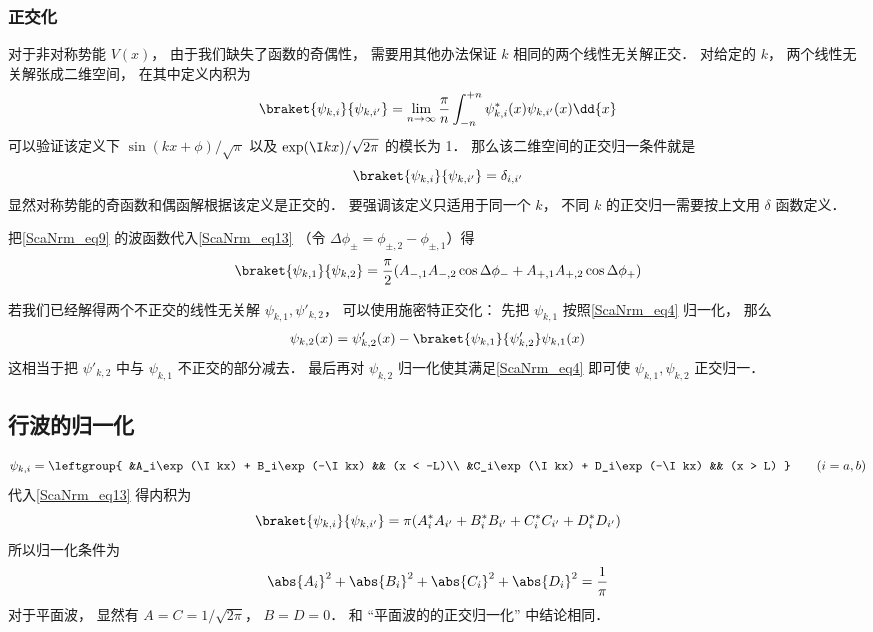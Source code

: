 \subsubsection{正交化}
对于非对称势能 $V(x)$， 由于我们缺失了函数的奇偶性， 需要用其他办法保证 $k$ 相同的两个线性无关解正交． 对给定的 $k$， 两个线性无关解张成二维空间， 在其中定义内积为
\begin{equation}\label{ScaNrm_eq13}
\braket{\psi_{k,i}}{\psi_{k,i'}} = \lim_{n\to\infty}\frac{\pi}{n}\int_{-n}^{+n} \psi_{k,i}^*(x) \psi_{k,i'}(x) \dd{x}
\end{equation}
可以验证该定义下 $\sin(kx+\phi)/\sqrt{\pi}$ 以及 $\exp(\I kx)/\sqrt{2\pi}$ 的模长为 1． 那么该二维空间的正交归一条件就是
\begin{equation}\label{ScaNrm_eq7}
\braket{\psi_{k,i}}{\psi_{k,i'}} = \delta_{i,i'}
\end{equation}
显然对称势能的奇函数和偶函解根据该定义是正交的． 要强调该定义只适用于同一个 $k$， 不同 $k$ 的正交归一需要按上文用 $\delta$ 函数定义．

把\autoref{ScaNrm_eq9} 的波函数代入\autoref{ScaNrm_eq13} （令 $\Delta\phi_\pm = \phi_{\pm, 2} - \phi_{\pm, 1}$）得
\begin{equation}
\braket{\psi_{k,1}}{\psi_{k,2}} = \frac{\pi}{2}(A_{-,1}A_{-,2}\cos\Delta\phi_- + A_{+,1}A_{+,2}\cos\Delta\phi_+)
\end{equation}


若我们已经解得两个不正交的线性无关解 $\psi_{k,1}, \psi'_{k,2}$， 可以使用施密特正交化： 先把 $\psi_{k,1}$ 按照\autoref{ScaNrm_eq4} 归一化， 那么
\begin{equation}
\psi_{k,2}(x) = \psi_{k,2}'(x) - \braket{\psi_{k,1}}{\psi'_{k,2}} \psi_{k,1}(x)
\end{equation}
这相当于把 $\psi'_{k,2}$ 中与 $\psi_{k,1}$ 不正交的部分减去． 最后再对 $\psi_{k,2}$ 归一化使其满足\autoref{ScaNrm_eq4} 即可使 $\psi_{k,1}, \psi_{k,2}$ 正交归一．



\subsection{行波的归一化}

\begin{equation}
\psi_{k,i} = \leftgroup{
    &A_i\exp(\I kx) + B_i\exp(-\I kx) && (x < -L)\\
    &C_i\exp(\I kx) + D_i\exp(-\I kx) && (x > L)
} \qquad (i = a,b)
\end{equation}
代入\autoref{ScaNrm_eq13} 得内积为
\begin{equation}
\braket{\psi_{k,i}}{\psi_{k,i'}} = \pi (A_i^* A_{i'} + B_i^* B_{i'} + C_i^* C_{i'} + D_i^* D_{i'})
\end{equation}
所以归一化条件为
\begin{equation}
\abs{A_i}^2 + \abs{B_i}^2 + \abs{C_i}^2 + \abs{D_i}^2= \frac{1}{\pi}
\end{equation}
对于平面波， 显然有 $A = C = 1/\sqrt{2\pi}$， $B = D = 0$． 和 “平面波的的正交归一化” 中结论相同．


